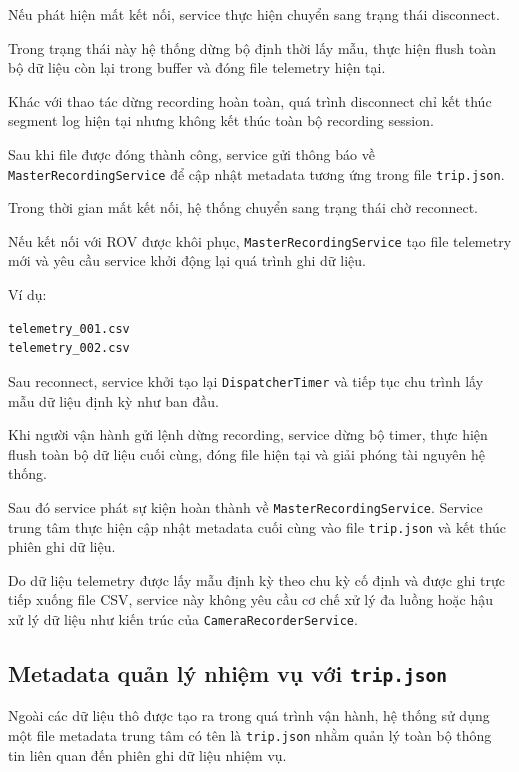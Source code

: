 \documentclass[../DoAn.tex]{subfiles}
\begin{document}
Nếu phát hiện mất kết nối, service thực hiện chuyển sang trạng thái disconnect.

Trong trạng thái này hệ thống dừng bộ định thời lấy mẫu, thực hiện flush toàn bộ dữ liệu còn lại trong buffer và đóng file telemetry hiện tại.

Khác với thao tác dừng recording hoàn toàn, quá trình disconnect chỉ kết thúc segment log hiện tại nhưng không kết thúc toàn bộ recording session.

Sau khi file được đóng thành công, service gửi thông báo về \texttt{MasterRecordingService} để cập nhật metadata tương ứng trong file \texttt{trip.json}.

Trong thời gian mất kết nối, hệ thống chuyển sang trạng thái chờ reconnect.

Nếu kết nối với ROV được khôi phục, \texttt{MasterRecordingService} tạo file telemetry mới và yêu cầu service khởi động lại quá trình ghi dữ liệu.

Ví dụ:

\begin{verbatim}
telemetry_001.csv
telemetry_002.csv
\end{verbatim}

Sau reconnect, service khởi tạo lại \texttt{DispatcherTimer} và tiếp tục chu trình lấy mẫu dữ liệu định kỳ như ban đầu.

Khi người vận hành gửi lệnh dừng recording, service dừng bộ timer, thực hiện flush toàn bộ dữ liệu cuối cùng, đóng file hiện tại và giải phóng tài nguyên hệ thống.

Sau đó service phát sự kiện hoàn thành về \texttt{MasterRecordingService}. Service trung tâm thực hiện cập nhật metadata cuối cùng vào file \texttt{trip.json} và kết thúc phiên ghi dữ liệu.

Do dữ liệu telemetry được lấy mẫu định kỳ theo chu kỳ cố định và được ghi trực tiếp xuống file CSV, service này không yêu cầu cơ chế xử lý đa luồng hoặc hậu xử lý dữ liệu như kiến trúc của \texttt{CameraRecorderService}.

\subsection{Metadata quản lý nhiệm vụ với \texttt{trip.json}}

Ngoài các dữ liệu thô được tạo ra trong quá trình vận hành, hệ thống sử dụng một file metadata trung tâm có tên là \texttt{trip.json} nhằm quản lý toàn bộ thông tin liên quan đến phiên ghi dữ liệu nhiệm vụ.
\end{document}
